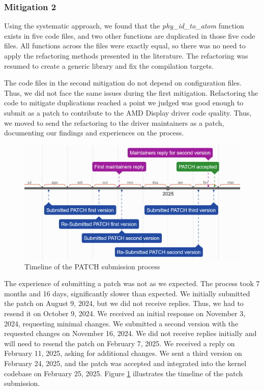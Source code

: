 \documentclass[12pt]{article}
\begin{document}
\subsubsection{Mitigation 2}

Using the systematic approach, we found that the \textit{phy\_id\_to\_atom} function exists in five code files, and two other functions are duplicated 
in those five code files. All functions across the files were exactly equal, 
so there was no need to apply the refactoring methods presented in the literature. 
The refactoring was resumed to create a generic library and fix the compilation targets.

The code files in the second mitigation do not depend on configuration files. Thus, 
we did not face the same issues during the first mitigation. Refactoring the code 
to mitigate duplications reached a point we judged was good enough to submit as a 
patch to contribute to the AMD Display driver code quality. Thus, we moved to send 
the refactoring to the driver maintainers as a patch, documenting our findings and experiences 
on the process.

\begin{figure}
\centering
\includegraphics[scale=0.45]{timeline_patch}
\caption{Timeline of the PATCH submission process}
\label{fig:timeline}
\end{figure}

The experience of submitting a patch was not as we expected. The process took 7 months and 16 days, significantly slower than expected. We initially submitted the patch on August 9, 2024, but we did not receive replies. Thus, we had to resend it on October 9, 2024. We received an initial response on November 3, 2024, requesting minimal changes. We submitted a second version with the requested changes on November 16, 2024. We did not receive replies initially and will need to resend the patch on February 7, 2025. We received a reply on February 11, 2025, asking for additional changes. We sent a third version on February 24, 2025, and the patch was accepted and integrated into the kernel codebase on February 25, 2025. Figure \ref{fig:timeline} illustrates the timeline of the patch submission.
\end{document}
